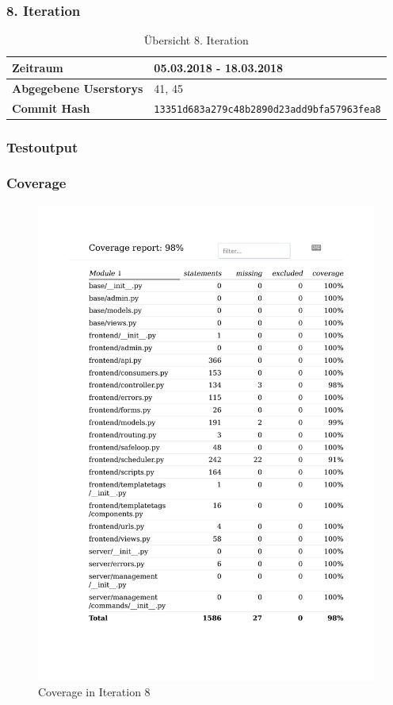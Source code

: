 \subsubsection{8. Iteration}
\begin{table}[H]
\begin{center}
	\begin{tabular}{| l | l |}
		\hline
		\textbf{Zeitraum} &  05.03.2018 - 18.03.2018\\\hline
		\textbf{Abgegebene Userstorys} & 41, 45\\\hline
		\textbf{Commit Hash} & \texttt{13351d683a279c48b2890d23add9bfa57963fea8} \\\hline
	\end{tabular}
	\caption{Übersicht 8. Iteration}
\end{center}
\end{table}
\subsubsection{Testoutput }

\subsubsection{Coverage}
\begin{figure}[H]
	\centering
\includegraphics[width=.9\textwidth]{test_output/08_iteration_coverage.pdf}
	\caption{Coverage in Iteration 8}
\end{figure}

